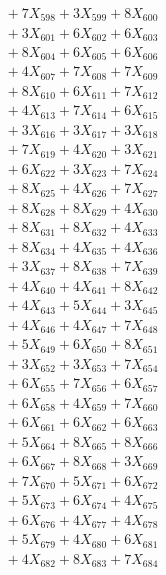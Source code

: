 \documentclass[a4paper,10pt]{article}
\begin{document}
{\begin{align}
&\;  + 7 X_{598} + 3 X_{599} + 8 X_{600} \\[0.3ex]
&\;  + 3 X_{601} + 6 X_{602} + 6 X_{603} \\[0.3ex]
&\;  + 8 X_{604} + 6 X_{605} + 6 X_{606} \\[0.3ex]
&\;  + 4 X_{607} + 7 X_{608} + 7 X_{609} \\[0.5ex]\allowbreak
&\;  + 8 X_{610} + 6 X_{611} + 7 X_{612} \\[0.3ex]
&\;  + 4 X_{613} + 7 X_{614} + 6 X_{615} \\[0.3ex]
&\;  + 3 X_{616} + 3 X_{617} + 3 X_{618} \\[0.3ex]
&\;  + 7 X_{619} + 4 X_{620} + 3 X_{621} \\[0.3ex]
&\;  + 6 X_{622} + 3 X_{623} + 7 X_{624} \\[0.3ex]
&\;  + 8 X_{625} + 4 X_{626} + 7 X_{627} \\[0.3ex]
&\;  + 8 X_{628} + 8 X_{629} + 4 X_{630} \\[0.3ex]
&\;  + 8 X_{631} + 8 X_{632} + 4 X_{633} \\[0.3ex]
&\;  + 8 X_{634} + 4 X_{635} + 4 X_{636} \\[0.3ex]
&\;  + 3 X_{637} + 8 X_{638} + 7 X_{639} \\[0.5ex]\allowbreak
&\;  + 4 X_{640} + 4 X_{641} + 8 X_{642} \\[0.3ex]
&\;  + 4 X_{643} + 5 X_{644} + 3 X_{645} \\[0.3ex]
&\;  + 4 X_{646} + 4 X_{647} + 7 X_{648} \\[0.3ex]
&\;  + 5 X_{649} + 6 X_{650} + 8 X_{651} \\[0.3ex]
&\;  + 3 X_{652} + 3 X_{653} + 7 X_{654} \\[0.3ex]
&\;  + 6 X_{655} + 7 X_{656} + 6 X_{657} \\[0.3ex]
&\;  + 6 X_{658} + 4 X_{659} + 7 X_{660} \\[0.3ex]
&\;  + 6 X_{661} + 6 X_{662} + 6 X_{663} \\[0.3ex]
&\;  + 5 X_{664} + 8 X_{665} + 8 X_{666} \\[0.3ex]
&\;  + 6 X_{667} + 8 X_{668} + 3 X_{669} \\[0.5ex]\allowbreak
&\;  + 7 X_{670} + 5 X_{671} + 6 X_{672} \\[0.3ex]
&\;  + 5 X_{673} + 6 X_{674} + 4 X_{675} \\[0.3ex]
&\;  + 6 X_{676} + 4 X_{677} + 4 X_{678} \\[0.3ex]
&\;  + 5 X_{679} + 4 X_{680} + 6 X_{681} \\[0.3ex]
&\;  + 4 X_{682} + 8 X_{683} + 7 X_{684} \\[0.3ex]

\end{align}}
\end{document}
